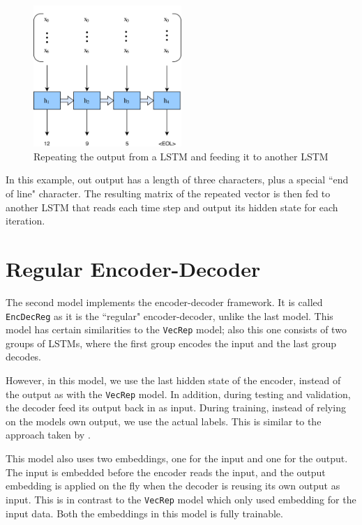 \begin{figure}[ht]
    \centering
    \includegraphics[width=0.5\textwidth]{fig/development_process/lstm-vector-projection-decoder.png}
    \caption{Repeating the output from a LSTM and feeding it to another LSTM}
    \label{fig:lstm-vector-projection-decoder}
\end{figure}

In this example, out output has a length of three characters, plus a special ``end of line" character. The resulting matrix of the repeated vector is then fed to another LSTM that reads each time step and output its hidden state for each iteration.


\section{Regular Encoder-Decoder}
\label{sec:regular_encoder_decoder}
The second model implements the encoder-decoder framework. It is called {\tt EncDecReg} as it is the ``regular" encoder-decoder, unlike the last model. This model has certain similarities to the {\tt VecRep} model; also this one consists of two groups of LSTMs, where the first group encodes the input and the last group decodes.

However, in this model, we use the last hidden state of the encoder, instead of the output as with the {\tt VecRep} model. In addition, during testing and validation, the decoder feed its output back in as input. During training, instead of relying on the models own output, we use the actual labels. This is similar to the approach taken by \citep{bengio2015scheduled}.

This model also uses two embeddings, one for the input and one for the output. The input is embedded before the encoder reads the input, and the output embedding is applied on the fly when the decoder is reusing its own output as input. This is in contrast to the {\tt VecRep} model which only used embedding for the input data. Both the embeddings in this model is fully trainable.

